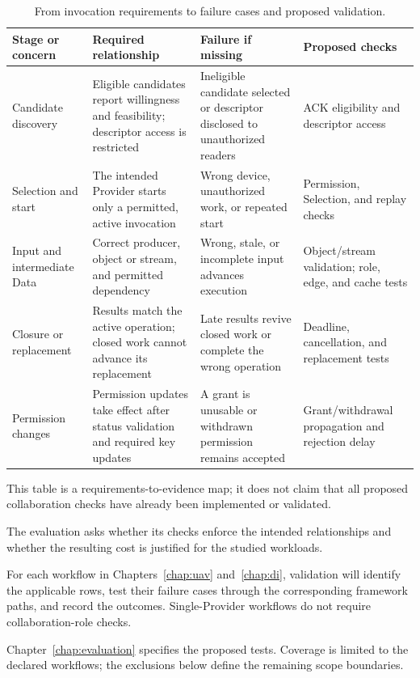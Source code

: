 \begin{table}[htbp]\singlespacing\centering\small
\caption{From invocation requirements to failure cases and proposed validation.}
\label{tab:framework-needs}
\begin{tabularx}{\textwidth}{p{}XXp{}}
\toprule Stage or concern & Required relationship & Failure if missing & Proposed checks\\\midrule
Candidate discovery & Eligible candidates report willingness and feasibility; descriptor access is restricted & Ineligible candidate selected or descriptor disclosed to unauthorized readers & ACK eligibility and descriptor access\\\midrule
Selection and start & The intended Provider starts only a permitted, active invocation & Wrong device, unauthorized work, or repeated start & Permission, Selection, and replay checks\\\midrule
Input and intermediate Data & Correct producer, object or stream, and permitted dependency & Wrong, stale, or incomplete input advances execution & Object/stream validation; role, edge, and cache tests\\\midrule
Closure or replacement & Results match the active operation; closed work cannot advance its replacement & Late results revive closed work or complete the wrong operation & Deadline, cancellation, and replacement tests\\\midrule
Permission changes & Permission updates take effect after status validation and required key updates & A grant is unusable or withdrawn permission remains accepted & Grant/withdrawal propagation and rejection delay\\\bottomrule
\end{tabularx}
\end{table}

This table is a requirements-to-evidence map; it does not claim that all proposed collaboration checks have already been implemented or validated.

The evaluation asks whether its checks enforce the intended relationships and whether the resulting cost is justified for the studied workloads.

For each workflow in Chapters~\ref{chap:uav} and~\ref{chap:di}, validation will identify the applicable rows, test their failure cases through the corresponding framework paths, and record the outcomes. Single-Provider workflows do not require collaboration-role checks.

Chapter~\ref{chap:evaluation} specifies the proposed tests. Coverage is limited to the declared workflows; the exclusions below define the remaining scope boundaries.

